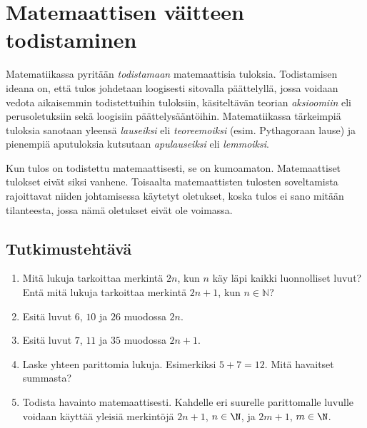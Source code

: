 \chapter{Matemaattisen väitteen todistaminen}

Matematiikassa pyritään {\em todistamaan} matemaattisia tuloksia. Todistamisen ideana on, että tulos johdetaan loogisesti sitovalla päättelyllä, jossa voidaan vedota aikaisemmin todistettuihin tuloksiin, käsiteltävän teorian {\em aksioomiin} eli perusoletuksiin sekä loogisiin päättelysääntöihin. Matematiikassa tärkeimpiä tuloksia sanotaan yleensä {\em lauseiksi} eli {\em teoreemoiksi} (esim. Pythagoraan lause) ja pienempiä aputuloksia kutsutaan {\em apulauseiksi} eli {\em lemmoiksi}.

Kun tulos on todistettu matemaattisesti, se on kumoamaton. Matemaattiset tulokset eivät siksi vanhene. Toisaalta matemaattisten tulosten soveltamista rajoittavat niiden johtamisessa käytetyt oletukset, koska tulos ei sano mitään tilanteesta, jossa nämä oletukset eivät ole voimassa.

\section*{Tutkimustehtävä}
\begin{enumerate}
\item Mitä lukuja tarkoittaa merkintä $2n$, kun $n$ käy läpi kaikki luonnolliset luvut? Entä mitä lukuja tarkoittaa merkintä $2n + 1$, kun $n\in \mathbb{N}$?
\item %
Esitä luvut $6$, $10$ ja $26$ muodossa $2n$.
\item %
Esitä luvut $7$, $11$ ja $35$ muodossa $2n+1$.
\item Laske yhteen parittomia lukuja. Esimerkiksi $5 + 7 = 12$. Mitä havaitset summasta?
\item Todista havainto matemaattisesti. Kahdelle eri suurelle parittomalle luvulle voidaan käyttää yleisiä merkintöjä $2n + 1$, $n \in\N$, ja $2m + 1$, $m \in\N$.
\end{enumerate}

